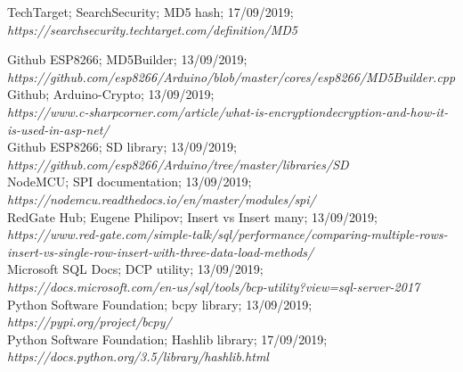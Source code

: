 \documentclass{report}
\begin{document}
\begin{thebibliography}{9}
        TechTarget; SearchSecurity; MD5 hash; 17/09/2019; \\
        \textit{https://searchsecurity.techtarget.com/definition/MD5}
        
        Github ESP8266; MD5Builder; 13/09/2019; \\
        \textit{https://github.com/esp8266/Arduino/blob/master/cores/esp8266/MD5Builder.cpp}\\
        
        Github; Arduino-Crypto; 13/09/2019; \\
        \textit{https://www.c-sharpcorner.com/article/what-is-encryptiondecryption-and-how-it-is-used-in-asp-net/}\\ 
        
        Github ESP8266; SD library; 13/09/2019; \\
        \textit{https://github.com/esp8266/Arduino/tree/master/libraries/SD}\\
        
        NodeMCU; SPI documentation; 13/09/2019;\\
        \textit{https://nodemcu.readthedocs.io/en/master/modules/spi/} \\
        
        RedGate Hub; Eugene Philipov; Insert vs Insert many; 13/09/2019; \\
        \textit{https://www.red-gate.com/simple-talk/sql/performance/comparing-multiple-rows-insert-vs-single-row-insert-with-three-data-load-methods/} \\
        
        Microsoft SQL Docs; DCP utility; 13/09/2019; \\
        \textit{https://docs.microsoft.com/en-us/sql/tools/bcp-utility?view=sql-server-2017} \\
        
        Python Software Foundation; bcpy library; 13/09/2019; \\
        \textit{https://pypi.org/project/bcpy/} \\
        
        Python Software Foundation; Hashlib library; 17/09/2019; \\
        \textit{https://docs.python.org/3.5/library/hashlib.html} \\
        

\end{thebibliography}
\end{document}
